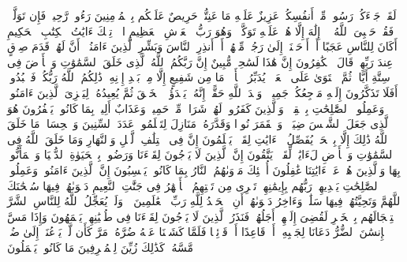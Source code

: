 \stopbuffer
\startbuffer[\q:9:128]
لَقَدۡ جَاۤءَكُمۡ رَسُولࣱ مِّنۡ أَنفُسِكُمۡ عَزِیزٌ عَلَیۡهِ مَا عَنِتُّمۡ حَرِیصٌ عَلَیۡكُم بِٱلۡمُؤۡمِنِینَ رَءُوفࣱ رَّحِیمࣱ%
\stopbuffer
\startbuffer[\q:9:129]
فَإِن تَوَلَّوۡا۟ فَقُلۡ حَسۡبِیَ ٱللَّهُ لَاۤ إِلَٰهَ إِلَّا هُوَۖ عَلَیۡهِ تَوَكَّلۡتُۖ وَهُوَ رَبُّ ٱلۡعَرۡشِ ٱلۡعَظِیمِ%
\stopbuffer
\startbuffer[\q:10:1]
الۤرۚ تِلۡكَ ءَایَٰتُ ٱلۡكِتَٰبِ ٱلۡحَكِیمِ%
\stopbuffer
\startbuffer[\q:10:2]
أَكَانَ لِلنَّاسِ عَجَبًا أَنۡ أَوۡحَیۡنَاۤ إِلَىٰ رَجُلࣲ مِّنۡهُمۡ أَنۡ أَنذِرِ ٱلنَّاسَ وَبَشِّرِ ٱلَّذِینَ ءَامَنُوۤا۟ أَنَّ لَهُمۡ قَدَمَ صِدۡقٍ عِندَ رَبِّهِمۡۗ قَالَ ٱلۡكَٰفِرُونَ إِنَّ هَٰذَا لَسَٰحِرࣱ مُّبِینٌ%
\stopbuffer
\startbuffer[\q:10:3]
إِنَّ رَبَّكُمُ ٱللَّهُ ٱلَّذِی خَلَقَ ٱلسَّمَٰوَٰتِ وَٱلۡأَرۡضَ فِی سِتَّةِ أَیَّامࣲ ثُمَّ ٱسۡتَوَىٰ عَلَى ٱلۡعَرۡشِۖ یُدَبِّرُ ٱلۡأَمۡرَۖ مَا مِن شَفِیعٍ إِلَّا مِنۢ بَعۡدِ إِذۡنِهِۦۚ ذَٰلِكُمُ ٱللَّهُ رَبُّكُمۡ فَٱعۡبُدُوهُۚ أَفَلَا تَذَكَّرُونَ%
\stopbuffer
\startbuffer[\q:10:4]
إِلَیۡهِ مَرۡجِعُكُمۡ جَمِیعࣰاۖ وَعۡدَ ٱللَّهِ حَقًّاۚ إِنَّهُۥ یَبۡدَؤُا۟ ٱلۡخَلۡقَ ثُمَّ یُعِیدُهُۥ لِیَجۡزِیَ ٱلَّذِینَ ءَامَنُوا۟ وَعَمِلُوا۟ ٱلصَّٰلِحَٰتِ بِٱلۡقِسۡطِۚ وَٱلَّذِینَ كَفَرُوا۟ لَهُمۡ شَرَابࣱ مِّنۡ حَمِیمࣲ وَعَذَابٌ أَلِیمُۢ بِمَا كَانُوا۟ یَكۡفُرُونَ%
\stopbuffer
\startbuffer[\q:10:5]
هُوَ ٱلَّذِی جَعَلَ ٱلشَّمۡسَ ضِیَاۤءࣰ وَٱلۡقَمَرَ نُورࣰا وَقَدَّرَهُۥ مَنَازِلَ لِتَعۡلَمُوا۟ عَدَدَ ٱلسِّنِینَ وَٱلۡحِسَابَۚ مَا خَلَقَ ٱللَّهُ ذَٰلِكَ إِلَّا بِٱلۡحَقِّۚ یُفَصِّلُ ٱلۡءَایَٰتِ لِقَوۡمࣲ یَعۡلَمُونَ%
\stopbuffer
\startbuffer[\q:10:6]
إِنَّ فِی ٱخۡتِلَٰفِ ٱلَّیۡلِ وَٱلنَّهَارِ وَمَا خَلَقَ ٱللَّهُ فِی ٱلسَّمَٰوَٰتِ وَٱلۡأَرۡضِ لَءَایَٰتࣲ لِّقَوۡمࣲ یَتَّقُونَ%
\stopbuffer
\startbuffer[\q:10:7]
إِنَّ ٱلَّذِینَ لَا یَرۡجُونَ لِقَاۤءَنَا وَرَضُوا۟ بِٱلۡحَیَوٰةِ ٱلدُّنۡیَا وَٱطۡمَأَنُّوا۟ بِهَا وَٱلَّذِینَ هُمۡ عَنۡ ءَایَٰتِنَا غَٰفِلُونَ%
\stopbuffer
\startbuffer[\q:10:8]
أُو۟لَٰۤئِكَ مَأۡوَىٰهُمُ ٱلنَّارُ بِمَا كَانُوا۟ یَكۡسِبُونَ%
\stopbuffer
\startbuffer[\q:10:9]
إِنَّ ٱلَّذِینَ ءَامَنُوا۟ وَعَمِلُوا۟ ٱلصَّٰلِحَٰتِ یَهۡدِیهِمۡ رَبُّهُم بِإِیمَٰنِهِمۡۖ تَجۡرِی مِن تَحۡتِهِمُ ٱلۡأَنۡهَٰرُ فِی جَنَّٰتِ ٱلنَّعِیمِ%
\stopbuffer
\startbuffer[\q:10:10]
دَعۡوَىٰهُمۡ فِیهَا سُبۡحَٰنَكَ ٱللَّهُمَّ وَتَحِیَّتُهُمۡ فِیهَا سَلَٰمࣱۚ وَءَاخِرُ دَعۡوَىٰهُمۡ أَنِ ٱلۡحَمۡدُ لِلَّهِ رَبِّ ٱلۡعَٰلَمِینَ%
\stopbuffer
\startbuffer[\q:10:11]
۞ وَلَوۡ یُعَجِّلُ ٱللَّهُ لِلنَّاسِ ٱلشَّرَّ ٱسۡتِعۡجَالَهُم بِٱلۡخَیۡرِ لَقُضِیَ إِلَیۡهِمۡ أَجَلُهُمۡۖ فَنَذَرُ ٱلَّذِینَ لَا یَرۡجُونَ لِقَاۤءَنَا فِی طُغۡیَٰنِهِمۡ یَعۡمَهُونَ%
\stopbuffer
\startbuffer[\q:10:12]
وَإِذَا مَسَّ ٱلۡإِنسَٰنَ ٱلضُّرُّ دَعَانَا لِجَنۢبِهِۦۤ أَوۡ قَاعِدًا أَوۡ قَاۤئِمࣰا فَلَمَّا كَشَفۡنَا عَنۡهُ ضُرَّهُۥ مَرَّ كَأَن لَّمۡ یَدۡعُنَاۤ إِلَىٰ ضُرࣲّ مَّسَّهُۥۚ كَذَٰلِكَ زُیِّنَ لِلۡمُسۡرِفِینَ مَا كَانُوا۟ یَعۡمَلُونَ%
